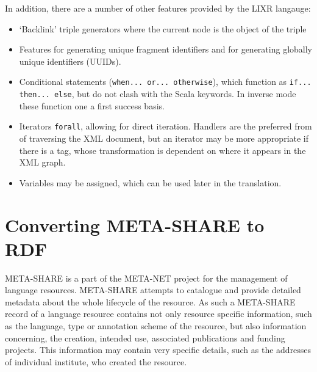 \documentclass{acm_proc_article-sp}
\begin{document}
In addition, there are a number of other features provided by the LIXR langauge:

\begin{itemize}
\item `Backlink' triple generators where the current node is the object of the triple
\item Features for generating unique fragment identifiers and for generating globally unique 
identifiers (UUIDs).
\item Conditional statements ({\tt when... or... otherwise}), which function as
{\tt if... then... else}, but do not clash with the Scala keywords. In inverse mode
these function one a first success basis.
\item Iterators {\tt forall}, allowing for direct iteration. Handlers are the 
preferred from of traversing the XML document, but an iterator may be more appropriate 
if there is a tag, whose transformation is dependent on where it appears in the
XML graph.
\item Variables may be assigned, which can be used later in the translation.
\end{itemize}

\section{Converting META-SHARE to RDF}
\label{sec:metashare}


META-SHARE is a part of the META-NET project for the management of language resources. 
META-SHARE attempts to catalogue and provide detailed metadata about the whole
lifecycle of the resource. As such a META-SHARE record of a language resource
contains not only resource specific information, such as the language, type
or annotation scheme of the resource, but also information concerning, the
creation, intended use, associated publications and funding projects. This 
information may contain very specific details, such as the addresses of individual
institute, who created the resource.
\end{document}
